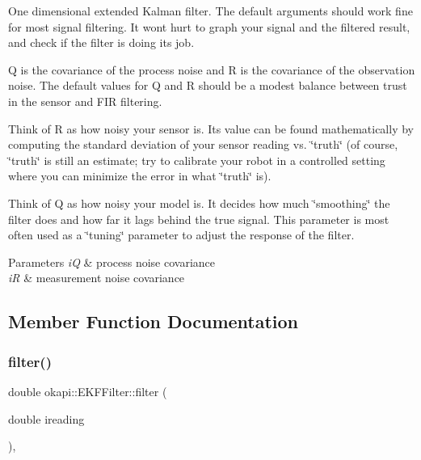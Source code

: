 One dimensional extended Kalman filter. The default arguments should work fine for most signal filtering. It won\textquotesingle{}t hurt to graph your signal and the filtered result, and check if the filter is doing its job.

Q is the covariance of the process noise and R is the covariance of the observation noise. The default values for Q and R should be a modest balance between trust in the sensor and F\+IR filtering.

Think of R as how noisy your sensor is. Its value can be found mathematically by computing the standard deviation of your sensor reading vs. \char`\"{}truth\char`\"{} (of course, \char`\"{}truth\char`\"{} is still an estimate; try to calibrate your robot in a controlled setting where you can minimize the error in what \char`\"{}truth\char`\"{} is).

Think of Q as how noisy your model is. It decides how much \char`\"{}smoothing\char`\"{} the filter does and how far it lags behind the true signal. This parameter is most often used as a \char`\"{}tuning\char`\"{} parameter to adjust the response of the filter.


\begin{DoxyParams}{Parameters}
{\em iQ} & process noise covariance \\
\hline
{\em iR} & measurement noise covariance \\
\hline
\end{DoxyParams}


\subsection{Member Function Documentation}
\mbox{\label{classokapi_1_1EKFFilter_a7deb4e14f154247b5521afa7603d09fd}} 
\subsubsection{\texorpdfstring{filter()}{filter()}\hspace{0.1cm}{\footnotesize\ttfamily [1/2]}}
{\footnotesize\ttfamily double okapi\+::\+E\+K\+F\+Filter\+::filter (\begin{DoxyParamCaption}\item[{double}]{ireading }\end{DoxyParamCaption})\hspace{0.3cm}{\ttfamily [override]}, {\ttfamily [virtual]}}

